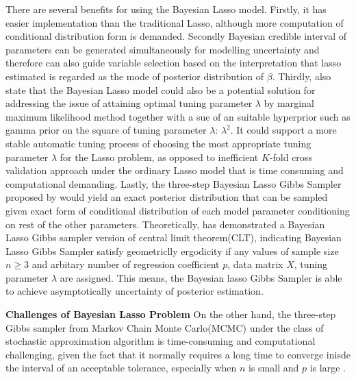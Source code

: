 There are several benefits for using the Bayesian Lasso model. Firstly, it has easier implementation than the traditional Lasso, although more computation of conditional distribution form is demanded. Secondly Bayesian credible interval of parameters can be generated simultaneously for modelling uncertainty and therefore can also guide variable selection based on the interpretation that lasso estimated is regarded as the mode of posterior distribution of $\beta$. 
Thirdly, \cite{park_casella_2008} also state that the Bayesian Lasso model could also be a potential solution for addressing the issue of attaining optimal tuning parameter $\lambda$ by marginal maximum likelihood method together with a sue of an suitable hyperprior such as gamma prior on the square of tuning parameter $\lambda$: $\lambda^2$. 
It could support a more stable automatic tuning process of choosing the most appropriate tuning parameter $\lambda$ for the Lasso problem, as opposed to inefficient $K$-fold cross validation approach under the ordinary Lasso model that is time consuming and computational demanding. Lastly, the three-step Bayesian Lasso Gibbs Sampler proposed by \cite{park_casella_2008} would yield an exact posterior distribution that can be sampled given exact form of conditional distribution of each model parameter conditioning on rest of the other parameters. Theoretically, \cite{khare_hobert_2013} has demonstrated a Bayesian Lasso Gibbs sampler version of central limit theorem(CLT), indicating Bayesian Lasso Gibbs Sampler satisfy geometriclly ergodicity if any values of sample size $n \geq 3$ and arbitary number of regression coefficient $p$, data matrix $X$, tuning parameter $\lambda$ are assigned. This means, the Bayesian lasso Gibbs Sampler is able to achieve asymptotically uncertainty of posterior estimation. 


\textbf{Challenges of Bayesian Lasso Problem}
On the other hand, the three-step Gibbs sampler from Markov Chain Monte Carlo(MCMC) under the class of stochastic approximation algorithm is time-consuming and computational challenging, given the fact that it normally requires a long time to converge inisde the interval of an acceptable tolerance, especially when $n$ is small and $p$ is large \cite{rajaratnam_sparks_2015}. 




